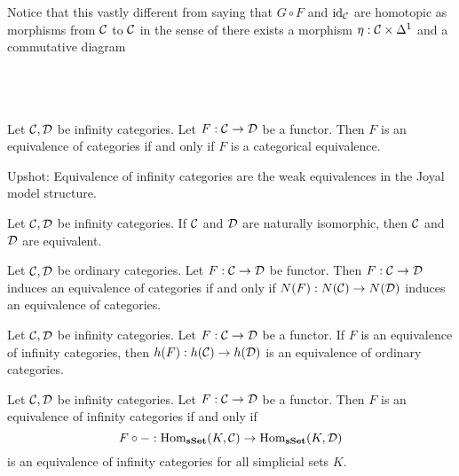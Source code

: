 \documentclass[a4paper]{article}
\begin{document}
Notice that this vastly different from saying that $G\circ F$ and $\text{id}_{\mathcal{C}}$ are homotopic as morphisms from $\mathcal{C}$ to $\mathcal{C}$ in the sense of there exists a morphism $\eta:\mathcal{C}\times\Delta^1$ and a commutative diagram \\~\\
\\~\\

\begin{lmm}{}{} Let $\mathcal{C},\mathcal{D}$ be infinity categories. Let $F:\mathcal{C}\to\mathcal{D}$ be a functor. Then $F$ is an equivalence of categories if and only if $F$ is a categorical equivalence. 
\end{lmm}

Upshot: Equivalence of infinity categories are the weak equivalences in the Joyal model structure. 

\begin{lmm}{}{} Let $\mathcal{C},\mathcal{D}$ be infinity categories. If $\mathcal{C}$ and $\mathcal{D}$ are naturally isomorphic, then $\mathcal{C}$ and $\mathcal{D}$ are equivalent. 
\end{lmm}

\begin{prp}{}{} Let $\mathcal{C},\mathcal{D}$ be ordinary categories. Let $F:\mathcal{C}\to\mathcal{D}$ be functor. Then $F:\mathcal{C}\to\mathcal{D}$ induces an equivalence of categories if and only if $N(F):N(\mathcal{C})\to N(\mathcal{D})$ induces an equivalence of categories. 
\end{prp}

\begin{prp}{}{} Let $\mathcal{C},\mathcal{D}$ be infinity categories. Let $F:\mathcal{C}\to\mathcal{D}$ be a functor. If $F$ is an equivalence of infinity categories, then $h(F):h(\mathcal{C})\to h(\mathcal{D})$ is an equivalence of ordinary categories. 
\end{prp}

\begin{prp}{}{} Let $\mathcal{C},\mathcal{D}$ be infinity categories. Let $F:\mathcal{C}\to\mathcal{D}$ be a functor. Then $F$ is an equivalence of infinity categories if and only if $$F\circ -:\operatorname{Hom}_\bold{sSet}(K,\mathcal{C})\to\operatorname{Hom}_\bold{sSet}(K,\mathcal{D})$$ is an equivalence of infinity categories for all simplicial sets $K$. 
\end{prp}
\end{document}
